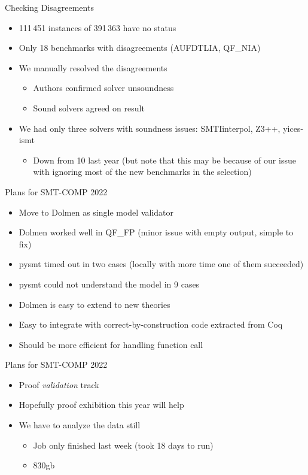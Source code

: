 \documentclass[table]{beamer}
\newcommand\vitem{\vfill\item}
\begin{document}
\begin{frame}{Checking Disagreements}

  \begin{itemize}
  \item  111\,451 instances of 391\,363 have no status

  \vitem Only 18 benchmarks with disagreements (AUFDTLIA, QF\_NIA)

  \vitem We manually resolved the disagreements
  \begin{itemize}
    \item Authors confirmed solver unsoundness
    \item Sound solvers agreed on result
  \end{itemize}

  \vitem We had only three solvers with soundness issues: SMTIinterpol, Z3++,
  yices-ismt
  \begin{itemize}
    \item Down from 10 last year
    \pause
    {\tiny (but note that this may be because of our issue with ignoring most of the
    new benchmarks in the selection)}


  \end{itemize}
  \end{itemize}
\end{frame}

\begin{frame}{Plans for SMT-COMP 2022}
  \begin{itemize}
    \item Move to Dolmen as single model validator

      \vitem Dolmen worked well in QF\_FP (minor issue with empty output, simple
      to fix)
      \vitem pysmt timed out in two cases (locally with more time one of them
      succeeded)
      \vitem pysmt could not understand the model in 9 cases
      \vitem Dolmen is easy to extend to new theories
      \vitem Easy to integrate with correct-by-construction code extracted from
      Coq
      \vitem Should be more efficient for handling function call

  \end{itemize}


\end{frame}

\begin{frame}{Plans for SMT-COMP 2022}
  \begin{itemize}
    \item Proof \textit{validation} track

      \vitem Hopefully proof exhibition this year will help

      \vitem We have to analyze the data still
      \begin{itemize}
        \item Job only finished last week (took 18 days to run)
        \item 830gb
      \end{itemize}

  \end{itemize}


\end{frame}
\end{document}
